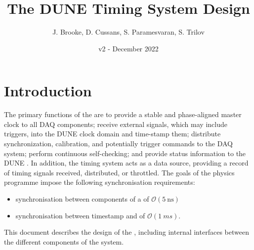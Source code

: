 \documentclass{dune}
\title{The DUNE Timing System  Design}
\author{J. Brooke, D. Cussans, S. Paramesvaran, S. Trilov}
\date{v2 - December 2022}
\begin{document}
\linenumbers
\maketitle

\tableofcontents

%

\section{Introduction}
\label{sec:intro}
The primary functions of the  are to provide a stable and phase-aligned master clock to all DAQ components; receive external signals, which may include triggers, into the DUNE clock domain and time-stamp them; distribute synchronization, calibration, and potentially trigger commands to the DAQ system; perform continuous self-checking; and provide status information to the DUNE . In addition, the timing system acts as a data source, providing a record of timing signals received, distributed, or throttled. The goals of the  physics programme impose the following synchronisation requirements:

\begin{itemize}
    \item synchronisation between components of a  of $\mathcal{O}(\SI{5}{\ns})$
    \item synchronisation between  timestamp and  of $\mathcal{O}(\SI{1}{ms})$.
\end{itemize}


This document describes the design of the , including internal interfaces between the different components of the system. 
\end{document}
